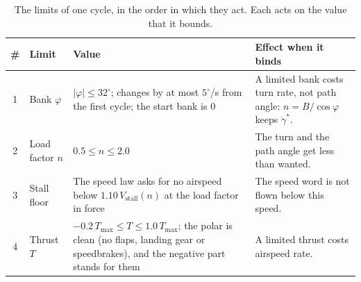 \begin{table}[t]
\centering
\caption{The limits of one cycle, in the order in which they act. Each acts on the value that it bounds.}
\label{tab:executor-limits}
\small
\renewcommand{\arraystretch}{1.2}
\begin{tabularx}{\textwidth}{@{}c l >{\raggedright\arraybackslash}p{4.4cm} >{\raggedright\arraybackslash}X@{}}
\toprule
\# & Limit & Value & Effect when it binds \\
\midrule
1 & Bank $\varphi$
  & $|\varphi| \le 32^\circ$; changes by at most $5^\circ$/s from the first cycle; the start bank is $0$
  & A limited bank costs turn rate, not path angle: $n = B/\cos\varphi$ keeps $\dot{\gamma}^{*}$. \\
2 & Load factor $n$
  & $0.5 \le n \le 2.0$
  & The turn and the path angle get less than wanted. \\
3 & Stall floor
  & The speed law asks for no airspeed below $1.10\,V_{\mathrm{stall}}(n)$ at the load factor in force
  & The speed word is not flown below this speed. \\
4 & Thrust $T$
  & $-0.2\,T_{\max} \le T \le 1.0\,T_{\max}$; the polar is clean (no flaps, landing gear or speedbrakes), and the negative part stands for them
  & A limited thrust costs airspeed rate. \\
\bottomrule
\end{tabularx}
\end{table}
